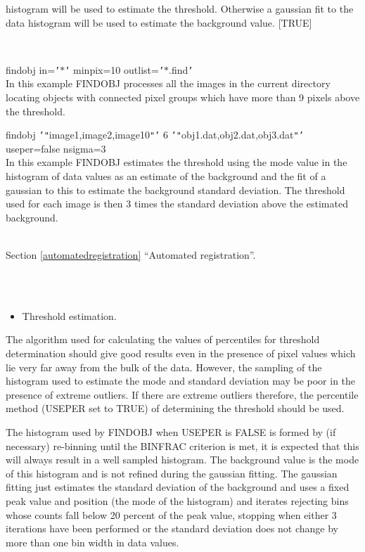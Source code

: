 \documentclass[twoside,11pt]{article}
\newcommand{\htmlref}[2]{#1}
\newcommand{\latexhtml}[2]{#1}
\renewcommand{\_}{\texttt{\symbol{95}}}
\newcommand{\qt}[1]{{\tt "}#1{\tt "}}
\newcommand{\qs}[1]{{\tt '}#1{\tt '}}
\newcommand{\routine}[1]{{\sc #1}}
\newcommand{\secref}[2]{\latexhtml{Section \ref{#1} ``#2''}{``\htmlref{#2}{#1}''}}
\newcommand{\sstexamples}[1]{
   \item[Examples:] \mbox{} \\
   \vspace{-3.5ex}
   \begin{description}
      #1
   \end{description}
}
\newcommand{\sstexamplesubsection}[2]{\sloppy \item{\ssttt #1} \mbox{} \\ #2 }
\newcommand{\sstnotes}[1]{\item[Notes:] \mbox{} \\[1.3ex] #1}
\newcommand{\sstdiytopic}[2]{\item[#1:] \mbox{} \\[1.3ex] #2}
\newcommand{\sstitemlist}[1]{
  \mbox{} \\
  \vspace{-3.5ex}
  \begin{itemize}
     #1
  \end{itemize}
}
\newcommand{\sstitem}{\item}
\newcommand{\sstexamples}[1]{
      \item[Examples:] \\
      \begin{description}
         #1
      \end{description}
      \\
   }
\newcommand{\sstexamplesubsection}[2]{\item[{\ssttt #1}] #2}
\newcommand{\sstnotes}[1]{\item[Notes:] #1 }
\newcommand{\sstdiytopic}[2]{\item[{#1:}] #2 }
\newcommand{\sstitemlist}[1]{
      \begin{itemize}
         #1
      \end{itemize}
      \\
   }
\newcommand{\sstitem}{\item}
\begin{document}
{{{         histogram will be used to estimate the threshold. Otherwise a
         gaussian fit to the data histogram will be used to estimate the
         background value.
         [TRUE]
      }
   }
   \sstexamples{
      \sstexamplesubsection{
         findobj in=\qs{$*$} minpix=10 outlist=\qs{$*$.find}
      } {
         In this example \routine{FINDOBJ} processes all the images in the current
         directory locating objects with connected pixel groups which
         have more than 9 pixels above the threshold.
      }
      \sstexamplesubsection{
         findobj \qs{\qt{image1,image2,image10}} 6
                 \qs{\qt{obj1.dat,obj2.dat,obj3.dat}}
                 useper=false nsigma=3
      } {
         In this example \routine{FINDOBJ} estimates the threshold using the mode
         value in the histogram of data values as an estimate of the
         background and the fit of a gaussian to this to estimate the
         background standard deviation. The threshold used for each image
         is then 3 times the standard deviation above the estimated
         background.
      }
   }
   \sstdiytopic{
      See also
   } {
      \secref{automatedregistration}{Automated registration}.
   }
   \sstnotes{
      \sstitemlist{

         \sstitem
         Threshold estimation.

      }
        The algorithm used for calculating the values of percentiles
        for threshold determination should give good results even in the
        presence of pixel values which lie very far away from the bulk
        of the data.  However, the sampling of the histogram used to
        estimate the mode and standard deviation may be poor in the
        presence of extreme outliers.  If there are extreme outliers
        therefore, the percentile method (USEPER set to TRUE) of
        determining the threshold should be used.

        The histogram used by \routine{FINDOBJ} when USEPER is FALSE is formed by
        (if necessary) re-binning until the BINFRAC criterion is met,
        it is expected that this will always result in a well sampled
        histogram. The background value is the mode of this histogram
        and is not refined during the gaussian fitting. The gaussian
        fitting just estimates the standard deviation of the background
        and uses a fixed peak value and position (the mode of the
        histogram) and iterates rejecting bins whose counts fall below
        20 percent of the peak value, stopping when either 3 iterations
        have been performed or the standard deviation does not change
        by more than one bin width in data values.

}}
\end{document}
